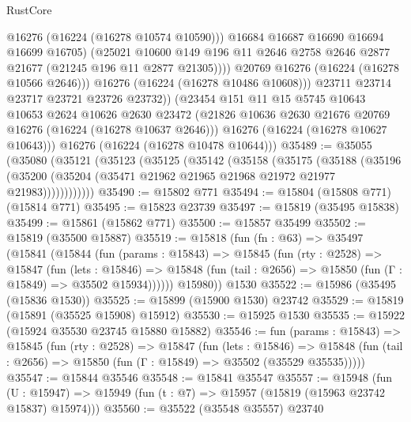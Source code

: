 \begin{lexlean}{RustCore}
\begin{coremodule}
                      @16276
                      (@16224 (@16278 @10574 @10590)))
                    @16684
                    @16687
                    @16690
                    @16694
                    @16699
                    @16705)
                  (@25021
                    @10600
                    @149
                    @196
                    @11
                    @2646
                    @2758
                    @2646
                    @2877
                    @21677
                    (@21245 @196 @11 @2877 @21305))))
              @20769
              @16276
              (@16224 (@16278 @10566 @2646)))
            @16276
            (@16224 (@16278 @10486 @10608)))
          @23711
          @23714
          @23717
          @23721
          @23726
          @23732))
      (@23454
        @151
        @11
        @15
        @5745
        @10643
        @10653
        @2624
        @10626
        @2630
        @23472
        (@21826 @10636 @2630 @21676 @20769 @16276 (@16224 (@16278 @10637 @2646)))
        @16276
        (@16224 (@16278 @10627 @10643)))
      @16276
      (@16224 (@16278 @10478 @10644)))
@35489 := @35055
    (@35080
      (@35121
        (@35123
          (@35125
            (@35142
              (@35158
                (@35175
                  (@35188
                    (@35196
                      (@35200 (@35204 (@35471 @21962 @21965 @21968 @21972 @21977 @21983))))))))))))
@35490 := @15802 @771
@35494 := @15804 (@15808 @771) (@15814 @771)
@35495 := @15823 @23739
@35497 := @15819 (@35495 @15838)
@35499 := @15861 (@15862 @771)
@35500 := @15857 @35499
@35502 := @15819 (@35500 @15887)
@35519 := @15818
    (fun (fn : @63) =>
    @35497
      (@15841
        (@15844
          (fun (params : @15843) =>
          @15845
            (fun (rty : @2528) =>
            @15847
              (fun (lets : @15846) =>
              @15848 (fun (tail : @2656) => @15850 (fun (Γ : @15849) => @35502 @15934))))))
        @15980))
    @1530
@35522 := @15986 (@35495 (@15836 @1530))
@35525 := @15899 (@15900 @1530) @23742
@35529 := @15819 (@15891 (@35525 @15908) @15912)
@35530 := @15925 @1530
@35535 := @15922 (@15924 @35530 @23745 @15880 @15882)
@35546 := fun (params : @15843) =>
  @15845
    (fun (rty : @2528) =>
    @15847
      (fun (lets : @15846) =>
      @15848 (fun (tail : @2656) => @15850 (fun (Γ : @15849) => @35502 (@35529 @35535)))))
@35547 := @15844 @35546
@35548 := @15841 @35547
@35557 := @15948
    (fun (U : @15947) => @15949 (fun (t : @7) => @15957 (@15819 (@15963 @23742 @15837) @15974)))
@35560 := @35522 (@35548 @35557) @23740

\end{coremodule}
\end{lexlean}

